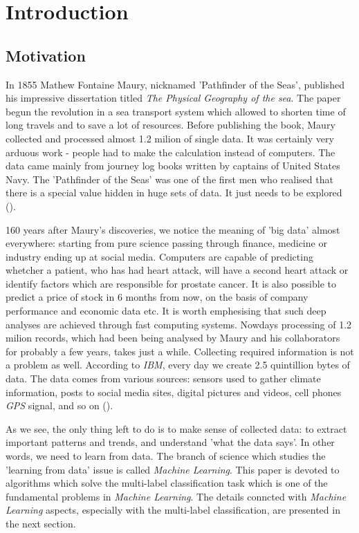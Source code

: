 
\chapter{Introduction}

\section{Motivation}

In 1855 Mathew Fontaine Maury, nicknamed 'Pathfinder of the Seas', published his impressive dissertation titled \textit{The Physical Geography of the sea}. The paper begun the revolution in a sea transport system which allowed to shorten time of long travels and to save a lot of resources. Before publishing the book, Maury collected and processed almost 1.2 milion of single data. It was certainly very arduous work - people had to make the calculation instead of computers. The data came mainly from journey log books written by captains of United States Navy. The 'Pathfinder of the Seas' was one of the first men who realised that there is a special value hidden in huge sets of data. It just needs to be explored (\cite{Data}).  

160 years after Maury's discoveries, we notice the meaning of 'big data' almost everywhere: starting from pure science passing through finance, medicine or industry ending up at social media. Computers are capable of predicting whetcher a patient, who has had heart attack, will have a second heart attack or identify factors which are responsible for prostate cancer. It is also possible to predict a price of stock in 6 months from now, on the basis of company performance and economic data etc.
It is worth emphesising that such deep analyses are achieved through fast computing systems. Nowdays processing of 1.2 milion records, which had been being analysed by Maury and his collaborators for probably a few years, takes just a while. Collecting required information is not a problem as well. According to \textit{IBM}, every day we create 2.5 quintillion bytes of data. The data comes from various sources: sensors used to gather climate information, posts to social media sites, digital pictures and videos, cell phones \textit{GPS} signal, and so on (\cite{IBM}).

As we see, the only thing left to do is to make sense of collected data: to extract important patterns and trends, and understand 'what the data says'. In other words, we need to learn from data. The branch of science which studies the 'learning from data' issue is called \textit{Machine Learning}. This paper is devoted to algorithms which solve the multi-label classification task which is one of the fundamental problems in \textit{Machine Learning}. The details conncted with \textit{Machine Learning} aspects, especially with the multi-label classification, are presented in the next section.


